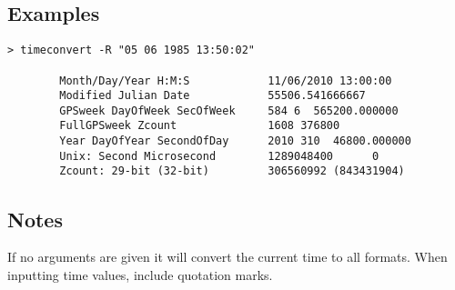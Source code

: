 \subsection{Examples}
\begin{\outputsize}
\begin{verbatim}
> timeconvert -R "05 06 1985 13:50:02"

        Month/Day/Year H:M:S            11/06/2010 13:00:00
        Modified Julian Date            55506.541666667
        GPSweek DayOfWeek SecOfWeek     584 6  565200.000000
        FullGPSweek Zcount              1608 376800
        Year DayOfYear SecondOfDay      2010 310  46800.000000
        Unix: Second Microsecond        1289048400      0
        Zcount: 29-bit (32-bit)         306560992 (843431904)
\end{verbatim}
\end{\outputsize}
\subsection{Notes}
If no arguments are given it will convert the current time to all formats. When inputting time values, include quotation marks.

%
